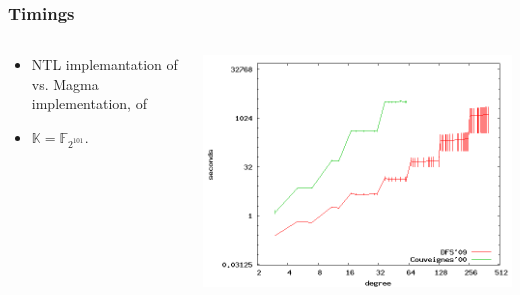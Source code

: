 \documentclass[10pt]{beamer}
\newcommand{\K}{\mathbb{K}}  %
\newcommand{\F}{\mathbb{F}}  %
\newcommand{\0}{\mathcal{O}}  %
\begin{document}

\begin{frame}
  \frametitle{Timings}

  
  \begin{columns}
    \begin{column}{0.4\textwidth}
      \begin{itemize}
      \item NTL implemantation of \cite{DFS09} vs.  Magma
        implementation, of \cite{Couveignes00}
      \item $\K = \F_{2^{101}}$.
      \end{itemize}
    \end{column}
    \begin{column}{0.6\textwidth}
             {\includegraphics[width=\textwidth]{2-101}}


\end{column}
\end{columns}
\end{frame}
\end{document}
